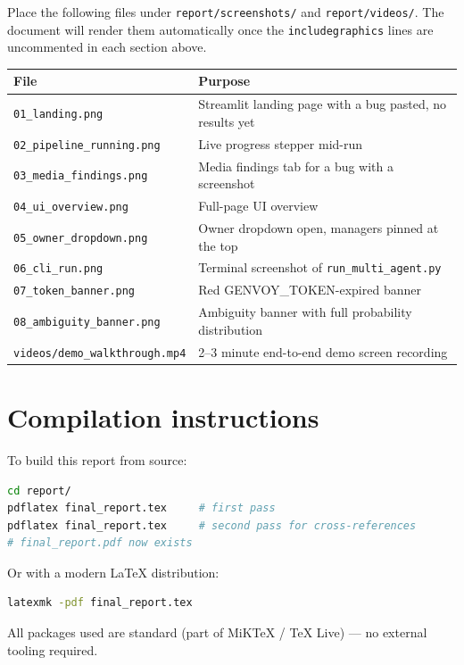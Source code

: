 \documentclass[11pt,a4paper]{article}
\begin{document}
Place the following files under \texttt{report/screenshots/} and
\texttt{report/videos/}. The document will render them automatically once
the \texttt{includegraphics} lines are uncommented in each section above.

\begin{table}[h]
\centering
\small
\begin{tabular}{ll}
\toprule
\textbf{File} & \textbf{Purpose} \\
\midrule
\texttt{01\_landing.png}         & Streamlit landing page with a bug pasted, no results yet \\
\texttt{02\_pipeline\_running.png} & Live progress stepper mid-run \\
\texttt{03\_media\_findings.png} & Media findings tab for a bug with a screenshot \\
\texttt{04\_ui\_overview.png}    & Full-page UI overview \\
\texttt{05\_owner\_dropdown.png} & Owner dropdown open, managers pinned at the top \\
\texttt{06\_cli\_run.png}        & Terminal screenshot of \texttt{run\_multi\_agent.py} \\
\texttt{07\_token\_banner.png}   & Red GENVOY\_TOKEN-expired banner \\
\texttt{08\_ambiguity\_banner.png} & Ambiguity banner with full probability distribution \\
\midrule
\texttt{videos/demo\_walkthrough.mp4} & 2--3 minute end-to-end demo screen recording \\
\bottomrule
\end{tabular}
\end{table}

\section{Compilation instructions}

To build this report from source:

\begin{lstlisting}[language=bash]
cd report/
pdflatex final_report.tex     # first pass
pdflatex final_report.tex     # second pass for cross-references
# final_report.pdf now exists
\end{lstlisting}

Or with a modern LaTeX distribution:

\begin{lstlisting}[language=bash]
latexmk -pdf final_report.tex
\end{lstlisting}

All packages used are standard (part of MiKTeX / TeX Live) --- no external
tooling required.
\end{document}
